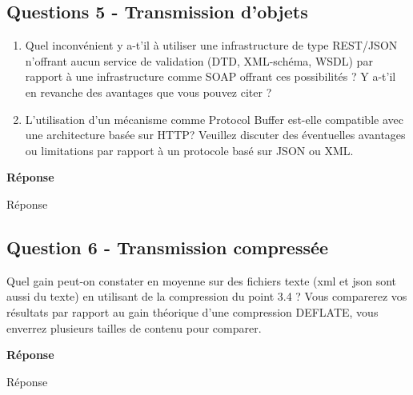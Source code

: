 \documentclass[francais,12pt]{article}
\begin{document}
	\subsection*{Questions 5 - Transmission d'objets}  
	\begin{enumerate}
		\item Quel inconvénient y a-t'il à utiliser une infrastructure de type REST/JSON n'offrant aucun service de validation (DTD, XML-schéma, WSDL) par rapport à une infrastructure comme SOAP offrant ces possibilités ? Y a-t'il en revanche des avantages que vous pouvez citer ?
		\item L'utilisation d'un mécanisme comme Protocol Buffer est-elle compatible avec une architecture basée sur HTTP? Veuillez discuter des éventuelles avantages ou limitations par rapport à un protocole basé sur JSON ou XML.
	\end{enumerate} 
	
	{\color[rgb]{0,0.5,0.23}\textbf{Réponse}}
	
	Réponse
	
	\subsection*{Question 6 - Transmission compressée}
	Quel gain peut-on constater en moyenne sur des fichiers texte (xml et json sont aussi du texte) en utilisant de la compression du point 3.4 ? Vous comparerez vos résultats par rapport au gain théorique d'une compression DEFLATE, vous enverrez plusieurs tailles de contenu pour comparer.
	
	{\color[rgb]{0,0.5,0.23}\textbf{Réponse}}
	
	Réponse
	
	
\end{document}
